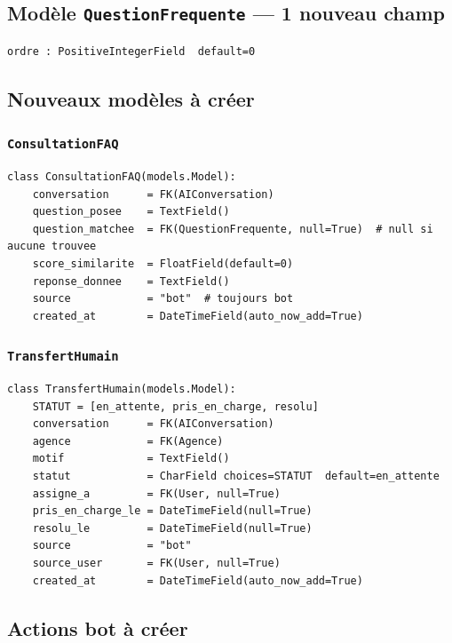 \documentclass[11pt,a4paper]{article}
\newcommand{\slug}[1]{\texttt{\color{AGTDark}#1}}
\begin{document}
\subsection{Modèle \slug{QuestionFrequente} — 1 nouveau champ}

\begin{lstlisting}
ordre : PositiveIntegerField  default=0
\end{lstlisting}

\subsection{Nouveaux modèles à créer}

\subsubsection{\slug{ConsultationFAQ}}

\begin{lstlisting}
class ConsultationFAQ(models.Model):
    conversation      = FK(AIConversation)
    question_posee    = TextField()
    question_matchee  = FK(QuestionFrequente, null=True)  # null si aucune trouvee
    score_similarite  = FloatField(default=0)
    reponse_donnee    = TextField()
    source            = "bot"  # toujours bot
    created_at        = DateTimeField(auto_now_add=True)
\end{lstlisting}

\subsubsection{\slug{TransfertHumain}}

\begin{lstlisting}
class TransfertHumain(models.Model):
    STATUT = [en_attente, pris_en_charge, resolu]
    conversation      = FK(AIConversation)
    agence            = FK(Agence)
    motif             = TextField()
    statut            = CharField choices=STATUT  default=en_attente
    assigne_a         = FK(User, null=True)
    pris_en_charge_le = DateTimeField(null=True)
    resolu_le         = DateTimeField(null=True)
    source            = "bot"
    source_user       = FK(User, null=True)
    created_at        = DateTimeField(auto_now_add=True)
\end{lstlisting}

\subsection{Actions bot à créer}
\end{document}

